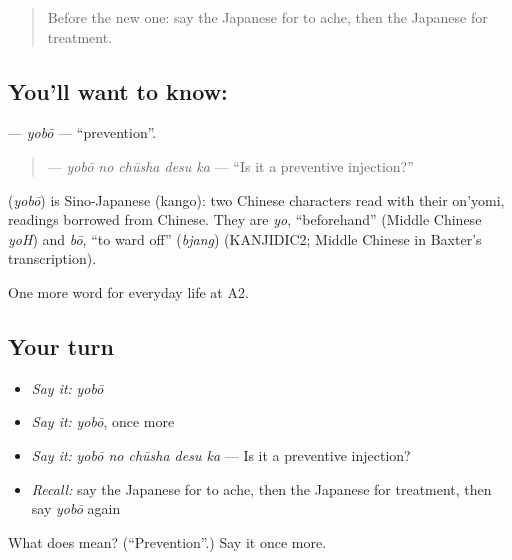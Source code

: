 \label{lesson:JA-C221-yobou}



\begin{quote}
Before the new one: say the Japanese for to ache, then the Japanese for treatment.
\end{quote}

\subsection*{You'll want to know: }
\textbf{} — \emph{yobō} — \textquotedblleft{}prevention\textquotedblright{}.

\begin{quote}
\textbf{ } — \emph{yobō no chūsha desu ka} — \textquotedblleft{}Is it a preventive injection?\textquotedblright{}
\end{quote}

\begin{cousinweb}
\textbf{} (\emph{yobō}) is Sino-Japanese (kango): two Chinese characters read with their on'yomi, readings borrowed from Chinese. They are \emph{yo}, \textquotedblleft{}beforehand\textquotedblright{} (Middle Chinese \emph{yoH}) and \emph{bō}, \textquotedblleft{}to ward off\textquotedblright{} (\emph{bjang}) (KANJIDIC2; Middle Chinese in Baxter's transcription).
\end{cousinweb}

\begin{grammarlens}[title={What you've built}]
One more word for everyday life at A2.
\end{grammarlens}

\subsection*{Your turn}
\begin{itemize}
\raggedright
  \item \emph{Say it:} \emph{yobō}
  \item \emph{Say it:} \emph{yobō}, once more
  \item \emph{Say it:} \emph{yobō no chūsha desu ka} — Is it a preventive injection?
  \item \emph{Recall:} say the Japanese for to ache, then the Japanese for treatment, then say \emph{yobō} again
\end{itemize}

\begin{tcolorbox}[breakable,colback=teal!4,colframe=teal!35!black,title={Before you move on}]
What does  mean? (\textquotedblleft{}Prevention\textquotedblright{}.) Say it once more.
\end{tcolorbox}
